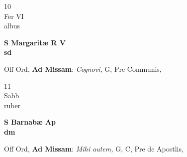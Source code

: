 \documentclass[10pt, openany]{book}
\begin{document}
        \begin{center}
            \begin{minipage}{3.5in}
                \vspace{2em}
                \begin{minipage}{0.5in}
                    {\Huge 10} \\
                    {\normalsize Fer VI} \\
                    {\normalsize albus}
                \end{minipage}
                \begin{minipage}{3.0in}
                    \textbf{ \large S Margaritæ R V \\
                    \textnormal{\normalsize sd}} \\ 
                \end{minipage}
                \begin{justify}Off Ord, \textbf{Ad Missam}: \textit{Cognovi,} G, Pre Communis,  
                \end{justify}
            \end{minipage}
        \end{center}
    
        \begin{center}
            \begin{minipage}{3.5in}
                \vspace{2em}
                \begin{minipage}{0.5in}
                    {\Huge 11} \\
                    {\normalsize Sabb} \\
                    {\normalsize ruber}
                \end{minipage}
                \begin{minipage}{3.0in}
                    \textbf{ \large S Barnabæ Ap \\
                    \textnormal{\normalsize dm}} \\ 
                \end{minipage}
                \begin{justify}Off Ord, \textbf{Ad Missam}: \textit{Mihi autem,} G, C, Pre de Apostlis,  
                \end{justify}
            \end{minipage}
        \end{center}
    
\end{document}
